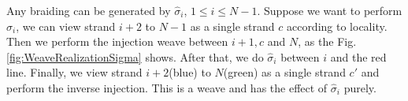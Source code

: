 Any braiding can be generated by $\hat{\sigma }_{i}$, $1\leq i\leq N-1$. Suppose we want to perform $\hat{\sigma }_{i}$, we can view strand $i+2$ to $N-1$ as a single strand $c$ according to locality. Then we perform the injection weave between $i+1,c$ and $N$, as the Fig.\ref{fig:WeaveRealizationSigma} shows. After that, we do $\hat{\sigma }_{i}$ between $i$ and the red line. Finally, we view strand $i+2$(blue) to $N$(green) as a single strand $c'$ and perform the inverse injection. This is a weave and has the effect of $\hat{\sigma }_{i}$ purely. 

\begin{figure}[h!]
\centering
{} %

\begin{tikzpicture}[x=0.75pt,y=0.75pt,yscale=-1,xscale=1]


\end{tikzpicture}
\end{figure}
